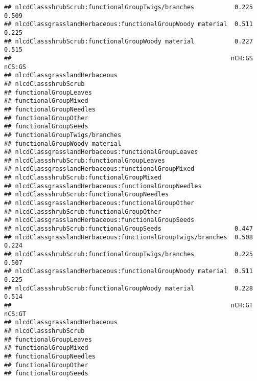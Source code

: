 \documentclass[]{article}
\begin{document}
\begin{verbatim}
## nlcdClassshrubScrub:functionalGroupTwigs/branches           0.225  0.509
## nlcdClassgrasslandHerbaceous:functionalGroupWoody material  0.511  0.225
## nlcdClassshrubScrub:functionalGroupWoody material           0.227  0.515
##                                                            nCH:GS nCS:GS
## nlcdClassgrasslandHerbaceous                                            
## nlcdClassshrubScrub                                                     
## functionalGroupLeaves                                                   
## functionalGroupMixed                                                    
## functionalGroupNeedles                                                  
## functionalGroupOther                                                    
## functionalGroupSeeds                                                    
## functionalGroupTwigs/branches                                           
## functionalGroupWoody material                                           
## nlcdClassgrasslandHerbaceous:functionalGroupLeaves                      
## nlcdClassshrubScrub:functionalGroupLeaves                               
## nlcdClassgrasslandHerbaceous:functionalGroupMixed                       
## nlcdClassshrubScrub:functionalGroupMixed                                
## nlcdClassgrasslandHerbaceous:functionalGroupNeedles                     
## nlcdClassshrubScrub:functionalGroupNeedles                              
## nlcdClassgrasslandHerbaceous:functionalGroupOther                       
## nlcdClassshrubScrub:functionalGroupOther                                
## nlcdClassgrasslandHerbaceous:functionalGroupSeeds                       
## nlcdClassshrubScrub:functionalGroupSeeds                    0.447       
## nlcdClassgrasslandHerbaceous:functionalGroupTwigs/branches  0.508  0.224
## nlcdClassshrubScrub:functionalGroupTwigs/branches           0.225  0.507
## nlcdClassgrasslandHerbaceous:functionalGroupWoody material  0.511  0.225
## nlcdClassshrubScrub:functionalGroupWoody material           0.228  0.514
##                                                            nCH:GT nCS:GT
## nlcdClassgrasslandHerbaceous                                            
## nlcdClassshrubScrub                                                     
## functionalGroupLeaves                                                   
## functionalGroupMixed                                                    
## functionalGroupNeedles                                                  
## functionalGroupOther                                                    
## functionalGroupSeeds                                                    

\end{verbatim}
\end{document}
